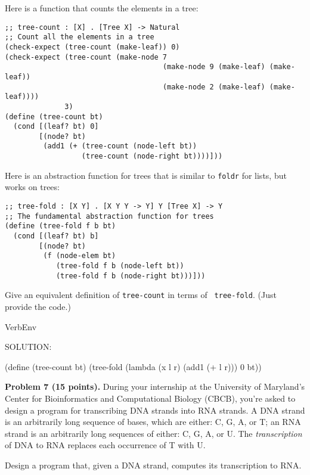\documentclass[12pt]{article}
\begin{document}
\noindent
Here is a function that counts the elements in a tree:
\begin{verbatim}
;; tree-count : [X] . [Tree X] -> Natural
;; Count all the elements in a tree
(check-expect (tree-count (make-leaf)) 0)
(check-expect (tree-count (make-node 7 
                                     (make-node 9 (make-leaf) (make-leaf))
                                     (make-node 2 (make-leaf) (make-leaf))))
              3)
(define (tree-count bt)
  (cond [(leaf? bt) 0]
        [(node? bt)
         (add1 (+ (tree-count (node-left bt))
                  (tree-count (node-right bt))))]))
\end{verbatim}
Here is an abstraction function for trees that is similar to
{\tt foldr} for lists, but works on trees:
\begin{verbatim}
;; tree-fold : [X Y] . [X Y Y -> Y] Y [Tree X] -> Y
;; The fundamental abstraction function for trees
(define (tree-fold f b bt)
  (cond [(leaf? bt) b]
        [(node? bt)
         (f (node-elem bt)
            (tree-fold f b (node-left bt))
            (tree-fold f b (node-right bt)))]))
\end{verbatim}
Give an equivalent definition of {\tt tree-count} in terms of {\tt
  tree-fold}.  (Just provide the code.)

\vspace{1em}

\newpage


\begin{SaveVerbatim}{VerbEnv}


SOLUTION:

(define (tree-count bt)
  (tree-fold (lambda (x l r) (add1 (+ l r))) 0 bt))

\end{SaveVerbatim}



\newpage
\noindent
{\bf Problem 7 (15 points).}  
%
During your internship at the University of Maryland's Center for
Bioinformatics and Computational Biology (CBCB), you're asked to
design a program for transcribing DNA strands into RNA strands.
%
A DNA strand is an arbitrarily long sequence of bases, which are
either: C, G, A, or T; an RNA strand is an arbitrarily long sequences
of either: C, G, A, or U.  The \emph{transcription} of DNA to RNA
replaces each occurrence of T with U.

Design a program that, given a DNA strand, computes its transcription
to RNA.
\end{document}
